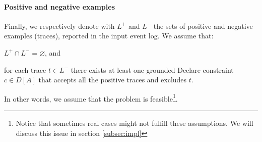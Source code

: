 \paragraph{Positive and negative examples} Finally, we respectively denote with $L^+$ and $L^-$ the sets of positive and negative examples (traces), reported in the input event log. We assume that:
\begin{enumerate*}[label=(\textit{\roman*})]
\item $L^+ \cap L^- = \varnothing$, and 
\item for each trace $t \in L^-$ there exists at least one grounded Declare constraint $c \in D[A]$ that accepts all the positive traces and excludes $t$.
\end{enumerate*}
In other words, we assume that the problem is feasible\footnote{Notice that sometimes real cases might not fulfill these assumptions. We will discuss this issue in section \ref{subsec:impl}}.





